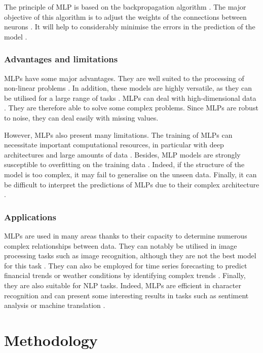 \documentclass[12pt,oneside]{book} %
\begin{document}
\noindent The principle of MLP is based on the backpropagation algorithm \cite{MLP1}. The major objective of this algorithm is to adjust the weights of the connections between neurons \citep{MLP1,MLP3}. It will help to considerably minimise the errors in the prediction of the model \citep{MLP1,MLP3}.

\subsection{Advantages and limitations}

\noindent MLPs have some major advantages. They are well suited to the processing of non-linear problems \cite{MLP3}. In addition, these models are highly versatile, as they can be utilised for a large range of tasks \cite{MLP1}. MLPs can deal with high-dimensional data \cite{MLP3}. They are therefore able to solve some complex problems. Since MLPs are robust to noise, they can deal easily with missing values.

\noindent However, MLPs also present many limitations. The training of MLPs can necessitate important computational resources, in particular with deep architectures and large amounts of data \cite{MLP3}. Besides, MLP models are strongly susceptible to overfitting on the training data \cite{MLP1}. Indeed, if the structure of the model is too complex, it may fail to generalise on the unseen data. Finally, it can be difficult to interpret the predictions of MLPs due to their complex architecture \cite{MLP1}.

\subsection{Applications}

\noindent MLPs are used in many areas thanks to their capacity to determine numerous complex relationships between data. They can notably be utilised in image processing tasks such as image recognition, although they are not the best model for this task \cite{MLP4}. They can also be employed for time series forecasting to predict financial trends or weather conditions by identifying complex trends \cite{MLP4}. Finally, they are also suitable for NLP tasks. Indeed, MLPs are efficient in character recognition and can present some interesting results in tasks such as sentiment analysis or machine translation \cite{MLP4}.

\chapter{Methodology}
\end{document}
